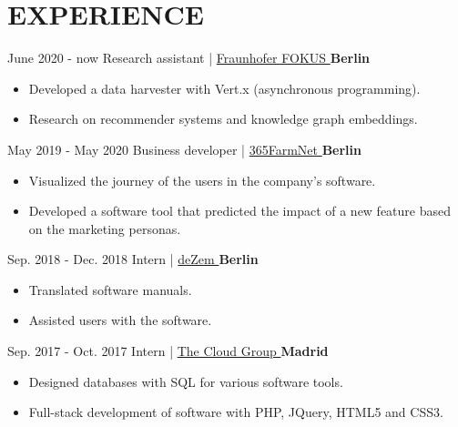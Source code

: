 \documentclass[]{commands}
\begin{document}
\section{EXPERIENCE}
\begin{entrylist}
  \entry
    {June 2020 - now}
    {Research assistant | }
    { \href{https://www.fokus.fraunhofer.de/}{\small Fraunhofer FOKUS \faMousePointer}}
    {\normalsize\textbf{\color{ipsgreen}\faMapMarker\space Berlin}}
    {\jobspace
    \begin{itemize}[leftmargin=*, itemsep = 0.1em]
        \item Developed a data harvester with Vert.x (asynchronous programming).
        \item Research on recommender systems and knowledge graph embeddings. \\
    \end{itemize}}

  \entry
    {May 2019 - May 2020}
    {Business developer | }
    { \href{https://www.365farmnet.com/en/}{\small 365FarmNet \faMousePointer}}
    {\normalsize\textbf{\color{ipsgreen}\faMapMarker\space Berlin}}
    {\jobspace
    \begin{itemize}[leftmargin=*, itemsep = 0.1em]
        \item Visualized the journey of the users in the company's software. 
        \item Developed a software tool that predicted the impact of a new feature based on the marketing personas. \\
    \end{itemize}}
    
  \entry
    {Sep. 2018 - Dec. 2018}
    {Intern | }
    { \href{https://www.dezem.de/en/}{\small deZem \faMousePointer}}
    {\normalsize\textbf{\color{ipsgreen}\faMapMarker\space Berlin}}
    {\jobspace
    \begin{itemize}[leftmargin=*, itemsep = 0.1em]
        \item Translated software manuals. 
        \item Assisted users with the software. \\
    \end{itemize}}
    
  \entry
    {Sep. 2017 - Oct. 2017}
    {Intern | }
    { \href{https://thecloud.group/}{\small The Cloud Group \faMousePointer}}
    {\normalsize\textbf{\color{ipsgreen}\faMapMarker\space Madrid}}
    {\jobspace
    \begin{itemize}[leftmargin=*, itemsep = 0.1em]
        \item Designed databases with SQL for various software tools. 
        \item Full-stack development of software with PHP, JQuery, HTML5 and CSS3. \\
    \end{itemize}}
    

\end{entrylist}
\end{document}
